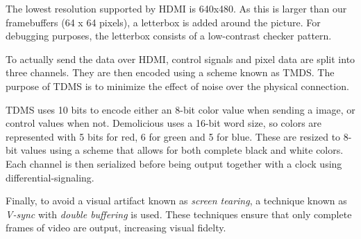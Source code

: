 \documentclass[../main/report.tex]{subfiles}
\begin{document}
The lowest resolution supported by HDMI is 640x480.
As this is larger than our framebuffers (64 x 64 pixels), a letterbox is added around the picture.
For debugging purposes, the letterbox consists of a low-contrast checker pattern.

To actually send the data over HDMI, control signals and pixel data are split into three channels.
They are then encoded using a scheme known as TMDS.
The purpose of TDMS is to minimize the effect of noise over the physical connection.

TDMS uses 10 bits to encode either an 8-bit color value when sending a image, or control values when not.
Demolicious uses a 16-bit word size, so colors are represented with 5 bits for red, 6 for green and 5 for blue.
These are resized to 8-bit values using a scheme that allows for both complete black and white colors.
Each channel is then serialized before being output together with a clock using differential-signaling.

Finally, to avoid a visual artifact known as \emph{screen tearing}, a technique known as \emph{V-sync} with \emph{double buffering} is used.
These techniques ensure that only complete frames of video are output, increasing visual fidelty.
\end{document}
